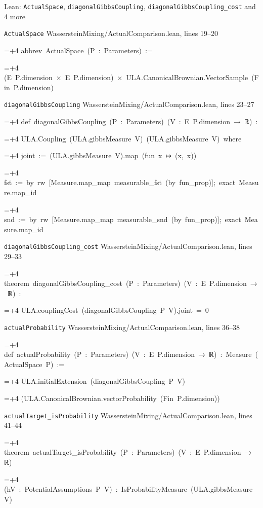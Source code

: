 \documentclass[11pt,a4paper]{article}
\newlength{\leancharwidth}
\newenvironment{leancode}{\par\smallskip\begingroup\ttfamily\footnotesize\raggedright
  \settowidth{\leancharwidth}{M}\setlength{\parskip}{0pt}\setlength{\parindent}{0pt}
  \frenchspacing}{\par\endgroup\smallskip}
\newcommand{\leanline}[2]{\hangindent=\dimexpr#1\leancharwidth+4\leancharwidth\relax
  \hangafter=1\noindent\hspace*{#1\leancharwidth}#2\par}
\newcommand{\leansource}[1]{\par{\footnotesize\color{leanmuted}#1}\par}
\begin{document}
\begin{leanbox}{Lean: \texttt{ActualSpace}, \texttt{diagonalGibbsCoupling}, \texttt{diagonalGibbsCoupling\_\allowbreak{}cost} and 4 more}
\leansource{\texttt{ActualSpace} \quad WassersteinMixing/\allowbreak{}ActualComparison.lean, lines 19–20}
\begin{leancode}
\leanline{0}{abbrev\ ActualSpace\ (P\ :\ Parameters)\ :=}
\leanline{2}{(E\ P.dimension\ ×\ E\ P.dimension)\ ×\ ULA.CanonicalBrownian.VectorSample\ (Fin\ P.dimension)}
\end{leancode}
\leansource{\texttt{diagonalGibbsCoupling} \quad WassersteinMixing/\allowbreak{}ActualComparison.lean, lines 23–27}
\begin{leancode}
\leanline{0}{def\ diagonalGibbsCoupling\ (P\ :\ Parameters)\ (V\ :\ E\ P.dimension\ →\ ℝ)\ :}
\leanline{4}{ULA.Coupling\ (ULA.gibbsMeasure\ V)\ (ULA.gibbsMeasure\ V)\ where}
\leanline{2}{joint\ :=\ (ULA.gibbsMeasure\ V).map\ (fun\ x\ ↦\ (x,\ x))}
\leanline{2}{fst\ :=\ by\ rw\ [Measure.map\_map\ measurable\_fst\ (by\ fun\_prop)];\ exact\ Measure.map\_id}
\leanline{2}{snd\ :=\ by\ rw\ [Measure.map\_map\ measurable\_snd\ (by\ fun\_prop)];\ exact\ Measure.map\_id}
\end{leancode}
\leansource{\texttt{diagonalGibbsCoupling\_\allowbreak{}cost} \quad WassersteinMixing/\allowbreak{}ActualComparison.lean, lines 29–33}
\begin{leancode}
\leanline{0}{theorem\ diagonalGibbsCoupling\_cost\ (P\ :\ Parameters)\ (V\ :\ E\ P.dimension\ →\ ℝ)\ :}
\leanline{4}{ULA.couplingCost\ (diagonalGibbsCoupling\ P\ V).joint\ =\ 0}
\end{leancode}
\leansource{\texttt{actualProbability} \quad WassersteinMixing/\allowbreak{}ActualComparison.lean, lines 36–38}
\begin{leancode}
\leanline{0}{def\ actualProbability\ (P\ :\ Parameters)\ (V\ :\ E\ P.dimension\ →\ ℝ)\ :\ Measure\ (ActualSpace\ P)\ :=}
\leanline{2}{ULA.initialExtension\ (diagonalGibbsCoupling\ P\ V)}
\leanline{4}{(ULA.CanonicalBrownian.vectorProbability\ (Fin\ P.dimension))}
\end{leancode}
\leansource{\texttt{actualTarget\_\allowbreak{}isProbability} \quad WassersteinMixing/\allowbreak{}ActualComparison.lean, lines 41–44}
\begin{leancode}
\leanline{0}{theorem\ actualTarget\_isProbability\ (P\ :\ Parameters)\ (V\ :\ E\ P.dimension\ →\ ℝ)}
\leanline{4}{(hV\ :\ PotentialAssumptions\ P\ V)\ :\ IsProbabilityMeasure\ (ULA.gibbsMeasure\ V)}
\end{leancode}

\end{leanbox}
\end{document}
